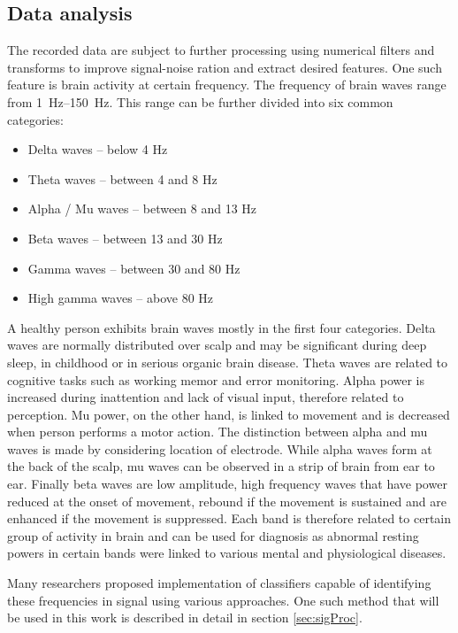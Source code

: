 \subsection{Data analysis}
The recorded data are subject to further processing using numerical filters and
transforms to improve signal-noise ration and extract desired features. 
One such feature is brain activity at certain frequency. The frequency of brain
waves range from \SIrange{1}{150}{\Hz}. This range can be further divided
into six common categories\cite{dominantF}:
\begin{itemize}
  \item Delta waves -- below 4 Hz
  \item Theta waves -- between 4 and 8 Hz
  \item Alpha / Mu waves -- between 8 and 13 Hz
  \item Beta waves -- between 13 and 30 Hz
  \item Gamma waves -- between 30 and 80 Hz
  \item High gamma waves -- above 80 Hz
\end{itemize}
A healthy person exhibits brain waves mostly in the first four categories. Delta
waves are normally distributed over scalp and may be significant during deep
sleep, in childhood or in serious organic brain disease.\cite{eegClass} Theta
waves are related to cognitive tasks such as working memor and error monitoring.
Alpha power is increased during inattention and lack of visual input, therefore
related to perception. Mu power, on the other hand, is linked to movement and is
decreased when person performs a motor action. The distinction between alpha and
mu waves is made by considering location of electrode. While alpha waves form at
the back of the scalp, mu waves can be observed in a strip of brain from ear to
ear. Finally beta waves are low amplitude, high frequency waves that have power
reduced at the onset of movement, rebound if the movement is sustained and are
enhanced if the movement is suppressed. Each band is therefore related to
certain group of activity in brain and can be used for diagnosis as abnormal
resting powers in certain bands were linked to various mental and physiological
diseases.\cite{dominantF}

Many researchers proposed implementation of classifiers capable of identifying
these frequencies in signal using various approaches. One such method that will
be used in this work is described in detail in section \ref{sec:sigProc}.

